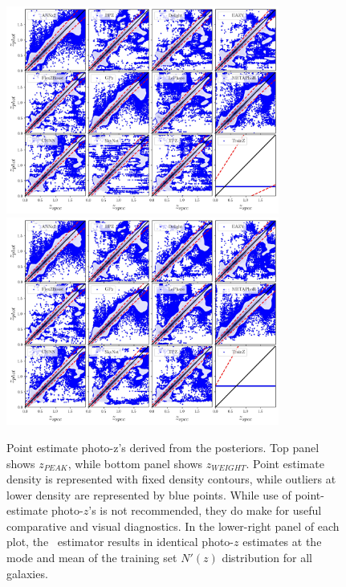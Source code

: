 \begin{figure}
\centering
\includegraphics[width=0.8\textwidth]{fig/ZPEAK_szpz_threecolumn_12codes_navy.jpg}\\
\includegraphics[width=0.8\textwidth]{fig/ZWEIGHT_szpz_threecolumn_12codes_navy.jpg}
\caption{Point estimate photo-z's derived from the posteriors. Top panel shows $z_{PEAK}$, while bottom panel shows $z_{WEIGHT}$.  Point estimate density is represented with fixed density contours, while outliers at lower density are represented by blue points.  While use of point-estimate photo-$z$'s is not recommended, they do make for useful comparative and visual diagnostics.  In the lower-right panel of each plot, the \trainz\ estimator results in identical photo-$z$ estimates at the mode and mean of the training set $N'(z)$ distribution for all galaxies.} \label{fig:pz_pointestimates}
\end{figure}


